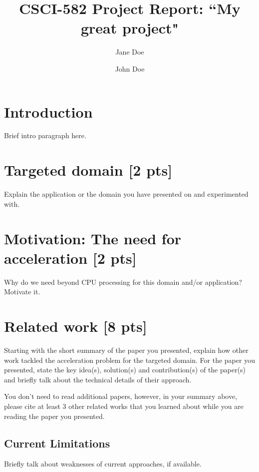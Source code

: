 \documentclass[sigconf,authorversion,nonacm]{acmart}
\begin{document}
\title{CSCI-582 Project Report: ``My great project"}

\author{Jane Doe}

\author{John Doe}

\maketitle

\section{Introduction}
Brief intro paragraph here. 

\section{Targeted domain {\small [2 pts]}}
Explain the application or the domain you have presented on and experimented with. 

\section{Motivation: The need for acceleration {\small {[2 pts]}}}

Why do we need beyond CPU processing for this domain and/or application? Motivate it.

\section{Related work {\small {[8 pts]}}}
Starting with the short summary of the paper you presented, explain how other work tackled the acceleration problem for the targeted domain. For the paper you presented, state the key idea(s), solution(s) and contribution(s) of the paper(s) and briefly talk about the technical details of their approach.

You don't need to read additional papers, however, in your summary above, please cite at least 3 other related works that you learned about while you are reading the paper you presented. 

\subsection{Current Limitations}
Briefly talk about weaknesses of current approaches, if available. 
\end{document}
